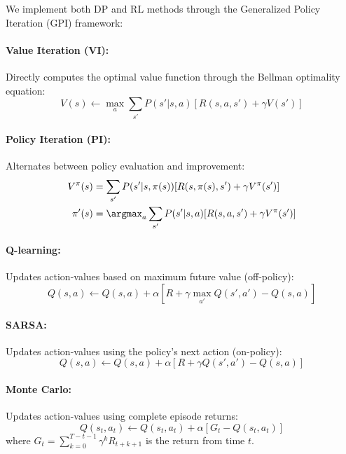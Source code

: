 We implement both DP and RL methods through the Generalized Policy Iteration (GPI) framework:

\paragraph{Value Iteration (VI):} Directly computes the optimal value function through the Bellman optimality equation:
\begin{equation}
V(s) \leftarrow \max_a \sum_{s'} P(s'|s,a)[R(s,a,s') + \gamma V(s')]
\end{equation}

\paragraph{Policy Iteration (PI):} Alternates between policy evaluation and improvement:
\begin{align}
V^{\pi}(s) &= \sum_{s'} P(s'|s,\pi(s))[R(s,\pi(s),s') + \gamma V^{\pi}(s')] \\
\pi'(s) &= \argmax_a \sum_{s'} P(s'|s,a)[R(s,a,s') + \gamma V^{\pi}(s')]
\end{align}

\paragraph{Q-learning:} Updates action-values based on maximum future value (off-policy):
\begin{equation}
Q(s,a) \leftarrow Q(s,a) + \alpha [R + \gamma \max_{a'} Q(s',a') - Q(s,a)]
\end{equation}

\paragraph{SARSA:} Updates action-values using the policy's next action (on-policy):
\begin{equation}
Q(s,a) \leftarrow Q(s,a) + \alpha [R + \gamma Q(s',a') - Q(s,a)]
\end{equation}

\paragraph{Monte Carlo:} Updates action-values using complete episode returns:
\begin{equation}
Q(s_t,a_t) \leftarrow Q(s_t,a_t) + \alpha[G_t - Q(s_t,a_t)]
\end{equation}
where $G_t = \sum_{k=0}^{T-t-1} \gamma^k R_{t+k+1}$ is the return from time $t$.

